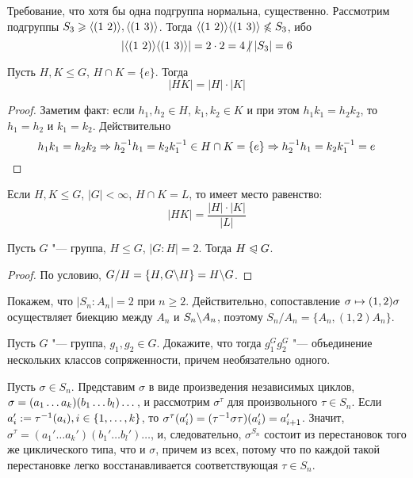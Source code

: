 \begin{example}
	Требование, что хотя бы одна подгруппа нормальна, существенно. Рассмотрим подгруппы $S_3 \geqslant \langle(1\ 2)\rangle, \langle(1\ 3)\rangle$. Тогда $\gl(1\ 2)\gr\gl(1\ 3)\gr \not\le S_3$, ибо
	\[
		|\gl(1\ 2)\gr\gl(1\ 3)\gr| = 2 \cdot 2 = 4 \centernot\mid |S_3| = 6
	\]
\end{example}

\begin{proposition}
	Пусть $H, K \le G$, $H \cap K = \{e\}$. Тогда
	\[
		|HK| = |H| \cdot |K|
	\]
\end{proposition}

\begin{proof}
	Заметим факт: если $h_1, h_2 \in H$, $k_1, k_2 \in K$ и при этом $h_1k_1 = h_2k_2$, то $h_1 = h_2$ и $k_1 = k_2$. Действительно
	\[
		h_1k_1 = h_2k_2 \Rightarrow h^{-1}_2h_1 = k_2k^{-1}_1 \in H \cap K = \{e\} \Rightarrow h^{-1}_2 h_1 = k_2 k^{-1}_1 = e
	\]
\end{proof}

\begin{exercise}
	Если $H, K \le G$, $|G| < \infty$, $H \cap K = L$, то имеет место равенство:
	\[
		|HK| = \frac{|H| \cdot |K|}{|L|}
	\]
\end{exercise}

\begin{proposition}
	Пусть $G$ "--- группа, $H \le G$, $|G : H| = 2$. Тогда $H \trianglelefteqslant G$.
\end{proposition}

\begin{proof}
	По условию, $G / H = \{H, G \backslash H\} = H \backslash G$.
\end{proof}

\begin{note}
	Покажем, что $|S_n : A_n| = 2$ при $n \ge 2$. Действительно, сопоставление $\sigma \hm\mapsto (1, 2)\sigma$ осуществляет биекцию между $A_n$ и $S_n \backslash A_n$, поэтому $S_n / A_n = \{A_n, (1, 2)A_n\}$.
\end{note}

\begin{exercise}
	Пусть $G$ "--- группа, $g_1, g_2 \in G$. Докажите, что тогда $g_1^Gg_2^G$ "--- объединение нескольких классов сопряженности, причем необязательно одного.
\end{exercise}

\begin{example}
	Пусть $\sigma \in S_n$. Представим $\sigma$ в виде произведения независимых циклов, $\sigma \hm= (a_1\dotsc a_k)(b_1\dotsc b_l)\dotsc$, и рассмотрим $\sigma^\tau$ для произвольного $\tau \in S_n$. Если $a_i' := \tau^{-1}(a_i), i \hm\in \{1, \dots, k\}$, то $\sigma^\tau(a_i') \hm= (\tau^{-1}\sigma\tau)(a_i') = a_{i + 1}'$. Значит, $\sigma^\tau = (a_1'\dotsc a_k')(b_1'\dotsc b_l')\dotsc$, и, следовательно, $\sigma^{S_n}$ состоит из перестановок того же циклического типа, что и $\sigma$, причем из всех, потому что по каждой такой перестановке легко восстанавливается соответствующая $\tau \in S_n$.
\end{example}